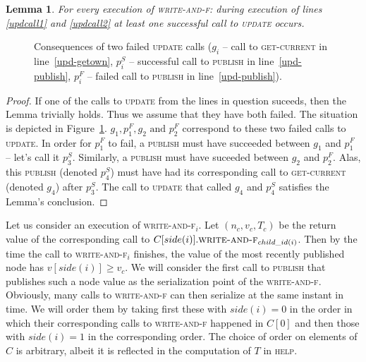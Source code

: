 \documentclass{thesis}
\newcommand{\atomic}[4]{\node(lab#1) at (#3,-#4+0.5) {#2};\draw (#3,-#4-0.1) to (lab#1);\node[inner sep=0pt](#1) at (#3,-#4) {};}
\newtheorem{lemma}{Lemma}
\newcommand{\fn}[1]{\textsc{#1}}
\begin{document}
\begin{lemma}
	For every execution of \fn{write-and-f}: during execution of lines \ref{updcall1} and \ref{updcall2} at least one successful call to \fn{update} occurs.
\end{lemma}
\begin{figure}
\caption{Consequences of two failed \fn{update} calls ($g_i$ -- call to \fn{get-current} in line~\ref{upd-getown}, $p^S_{i}$ -- successful call to \fn{publish} in line~\ref{upd-publish}, $p^F_{i}$ -- failed call to \fn{publish} in line~\ref{upd-publish}).}
\label{fig-only-two-pubs}
\end{figure}

\begin{proof}
	If one of the calls to \fn{update} from the lines in question suceeds, then the Lemma trivially holds. Thus we assume that they have both failed. The situation is depicted
	in Figure~\ref{fig-only-two-pubs}. $g_1, p^F_1, g_2 \text{ and } p^F_2$ correspond to these two failed calls to \fn{update}. In order for $p^F_1$ to fail, a \fn{publish} must have
	succeeded between $g_1$ and $p^F_1$ -- let's call it $p^S_3$. Similarly, a \fn{publish} must have suceeded between $g_2$ and $p^F_2$. Alas, this \fn{publish} (denoted $p^S_4$) must have had
	its corresponding call to \fn{get-current} (denoted $g_4$) after $p^S_3$. The call to \fn{update} that called $g_4$ and $p^S_4$ satisfies the Lemma's conclusion.
\end{proof}

Let us consider an execution of \fn{write-and-f$_i$}. Let $(n_c, v_c, T_c)$ be the return value of the corresponding call to $C[side(i)].\fn{write-and-f$_{child\_id(i)}$}$. Then by the time the call to
\fn{write-and-f$_i$} finishes, the value of the most recently published node has $v[side(i)] \geq v_c$. We will consider the first call to \fn{publish} that publishes such a node value as the serialization
point of the \fn{write-and-f}. Obviously, many calls to \fn{write-and-f} can then serialize at the same instant in time. We will order them by taking first these with $side(i) = 0$ in the order in which
their corresponding calls to \fn{write-and-f} happened in $C[0]$ and then those with $side(i) = 1$ in the corresponding order. The choice of order on elements of $C$ is arbitrary, albeit it is reflected
in the computation of $T$ in \fn{help}.
\end{document}
